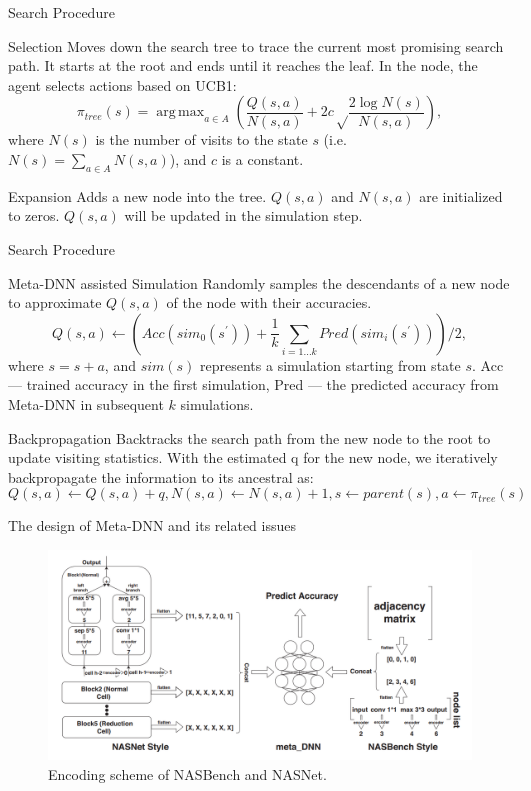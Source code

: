 \documentclass{beamer}
\DeclareMathOperator*{\argmax}{arg\,max}
\begin{document}
\begin{frame}{Search Procedure}
\begin{block}{Selection}
Moves down the search tree to trace the current most promising search path. It starts at the root and ends until it reaches the leaf. In the node, the agent selects actions based on UCB1:
$$\pi_{tree}(s) = \displaystyle \argmax_{a \in A} \left( \frac{Q(s, a)}{N(s, a)} + 2c
\sqrt\frac{2 \log N(s)}{N(s, a)}\right),$$
where $N(s)$ is the number of visits to the state $s$ (i.e. $N(s) = \sum_{a\in A} N(s, a)$), and $c$ is a constant.
\end{block}
\begin{block}{Expansion}
Adds a new node into the tree. $Q(s, a)$ and $N(s, a)$ are initialized to zeros. $Q(s, a)$ will be updated in the simulation step.
\end{block}
\end{frame}

\begin{frame}{Search Procedure}
\begin{block}{Meta-DNN assisted Simulation}
Randomly samples the descendants of a new node to approximate $Q(s, a)$ of the
node with their accuracies. 
$$Q(s, a) \gets \left(Acc(sim_{0}(s^{'})) + \frac{1}{k} \sum_{i=1\dots k} Pred(sim_{i}(s^{'}))\right) /2, $$
where $s = s + a$, and $sim(s)$ represents a simulation
starting from state $s$. Acc --- trained accuracy in the first simulation, Pred --- the predicted accuracy from Meta-DNN in subsequent $k$ simulations.
\end{block}
\begin{block}{Backpropagation}
Backtracks the search path from the
new node to the root to update visiting statistics. 
With the estimated q for the new node, we iteratively backpropagate the information to its ancestral as:
$$Q(s, a) \gets Q(s, a) + q, N(s, a) \gets N(s, a)+1, s \gets parent(s), a \gets \pi_{tree}(s)$$
\end{block}
\end{frame}



\begin{frame}{The design of Meta-DNN and its related issues}
\centering 
\begin{figure}
        \centering
        \includegraphics[scale=0.42]{images/nas4.png}
        \caption{Encoding scheme of NASBench and NASNet.}
    \end{figure}
\end{frame}
\end{document}
